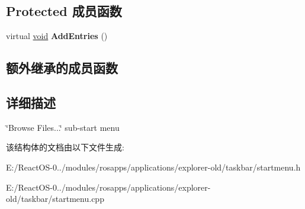 \subsection*{Protected 成员函数}
\begin{DoxyCompactItemize}
\item 
\mbox{\label{struct_browse_menu_a797317e9315e7a36b0ddd76c1f5a35d5}} 
virtual \hyperlink{interfacevoid}{void} {\bfseries Add\+Entries} ()
\end{DoxyCompactItemize}
\subsection*{额外继承的成员函数}


\subsection{详细描述}
\char`\"{}\+Browse Files...\char`\"{} sub-\/start menu 

该结构体的文档由以下文件生成\+:\begin{DoxyCompactItemize}
\item 
E\+:/\+React\+O\+S-\/0../modules/rosapps/applications/explorer-\/old/taskbar/startmenu.\+h\item 
E\+:/\+React\+O\+S-\/0../modules/rosapps/applications/explorer-\/old/taskbar/startmenu.\+cpp\end{DoxyCompactItemize}
